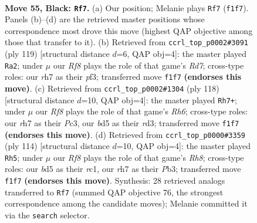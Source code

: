 \documentclass[11pt]{article}
\begin{document}
\clearpage

\begin{figure}[p]\centering
\begin{subfigure}{0.46\textwidth}\centering
\resizebox{\linewidth}{!}{%
\newchessgame
\chessboard[
  setfen={8/1Pk4R/8/3B4/8/4K3/8/5r2 b - - 4 55},
  showmover=false,
  pgfstyle=straightmove, color=movearrow, markmove={f1-f7}
]}
\caption{}
\end{subfigure}\hfill
\begin{subfigure}{0.46\textwidth}\centering
\resizebox{\linewidth}{!}{%
\newchessgame
\chessboard[
  setfen={8/8/8/4kP2/8/5P1B/3r4/6K1 b - - 9 60},
  showmover=false,
  pgfstyle=straightmove, color=movearrow, markmove={d2-a2}
]}
\caption{}
\end{subfigure}
\\[4pt]
\begin{subfigure}{0.46\textwidth}\centering
\resizebox{\linewidth}{!}{%
\newchessgame
\chessboard[
  setfen={8/3k4/7R/2Kp4/8/2Pr4/8/8 w - - 5 60},
  showmover=false,
  pgfstyle=straightmove, color=movearrow, markmove={h6-h7}
]}
\caption{}
\end{subfigure}\hfill
\begin{subfigure}{0.46\textwidth}\centering
\resizebox{\linewidth}{!}{%
\newchessgame
\chessboard[
  setfen={7R/3k4/8/8/8/1PpK4/8/2r5 w - - 16 58},
  showmover=false,
  pgfstyle=straightmove, color=movearrow, markmove={h8-h5}
]}
\caption{}
\end{subfigure}
\caption{\textbf{Move 55, Black: \texttt{Rf7}.} (a) Our position; Melanie plays \texttt{Rf7} (\texttt{f1f7}). Panels (b)--(d) are the retrieved master positions whose correspondence most drove this move (highest QAP objective among those that transfer to it). (b) Retrieved from \texttt{ccrl\_top\_p0002\#3091} (ply 119) [structural distance $d$=6, QAP obj=4]: the master played \texttt{Ra2}; under $\mu$ our \emph{Rf8} plays the role of that game's \emph{Rd7}; cross-type roles: our \emph{r}h7 as their \emph{p}f3; transferred move \texttt{f1f7} \textbf{(endorses this move)}. (c) Retrieved from \texttt{ccrl\_top\_p0002\#1304} (ply 118) [structural distance $d$=10, QAP obj=4]: the master played \texttt{Rh7+}; under $\mu$ our \emph{Rf8} plays the role of that game's \emph{Rh6}; cross-type roles: our \emph{r}h7 as their \emph{P}c3, our \emph{b}d5 as their \emph{r}d3; transferred move \texttt{f1f7} \textbf{(endorses this move)}. (d) Retrieved from \texttt{ccrl\_top\_p0000\#3359} (ply 114) [structural distance $d$=10, QAP obj=4]: the master played \texttt{Rh5}; under $\mu$ our \emph{Rf8} plays the role of that game's \emph{Rh8}; cross-type roles: our \emph{b}d5 as their \emph{r}c1, our \emph{r}h7 as their \emph{P}b3; transferred move \texttt{f1f7} \textbf{(endorses this move)}. Synthesis: 28 retrieved analogs transferred to \texttt{Rf7} (summed QAP objective 76, the strongest correspondence among the candidate moves); Melanie committed it via the \texttt{search} selector.}
\label{fig:thought-m109}
\end{figure}
\end{document}
